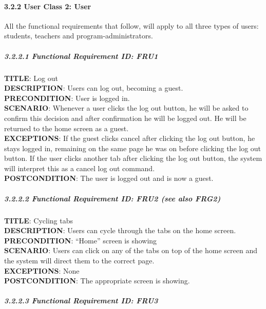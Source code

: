 \documentclass[12pt]{article}
\begin{document}
\paragraph{3.2.2 User Class 2: User}\label{user-class-2-user}

All the functional requirements that follow, will apply to all three
types of users: students, teachers and program-administrators.

\subparagraph{3.2.2.1 Functional Requirement \textbf{ID}:
FRU1\\}\label{functional-requirement-id-fru1}

\textbf{TITLE}: Log out\\\textbf{DESCRIPTION}: Users can log out,
becoming a guest.\\\textbf{PRECONDITION}: User is logged
in.\\\textbf{SCENARIO}: Whenever a user clicks the log out button, he
will be asked to confirm this decision and after confirmation he will be
logged out. He will be returned to the home screen as a
guest.\\\textbf{EXCEPTIONS}: If the guest clicks cancel after clicking
the log out button, he stays logged in, remaining on the same page he
was on before clicking the log out button. If the user clicks another
tab after clicking the log out button, the system will interpret this as
a cancel log out command.\\\textbf{POSTCONDITION}: The user is logged
out and is now a guest.

\subparagraph{3.2.2.2 Functional Requirement \textbf{ID}: FRU2 (see also
FRG2)\\}\label{functional-requirement-id-fru2-see-also-frg2}

\textbf{TITLE}: Cycling tabs\\\textbf{DESCRIPTION}: Users can cycle
through the tabs on the home screen.\\\textbf{PRECONDITION}: ``Home''
screen is showing\\\textbf{SCENARIO}: Users can click on any of the tabs
on top of the home screen and the system will direct them to the correct
page.\\\textbf{EXCEPTIONS}: None\\\textbf{POSTCONDITION}: The
appropriate screen is showing.

\subparagraph{3.2.2.3 Functional Requirement \textbf{ID}:
FRU3\\}\label{functional-requirement-id-fru3}
\end{document}
